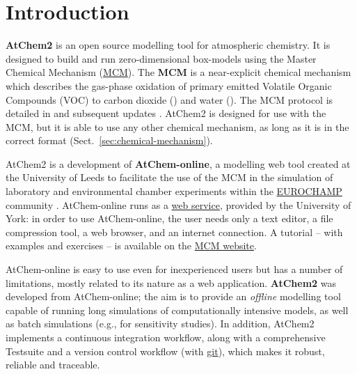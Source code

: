 %
%
%
%

\chapter{Introduction} \label{ch:introduction}

\textbf{AtChem2} is an open source modelling tool for atmospheric
chemistry. It is designed to build and run zero-dimensional
box-models using the Master Chemical Mechanism
(\href{https://mcm.york.ac.uk/MCM}{MCM}). The \textbf{MCM} is a
near-explicit chemical mechanism which describes the gas-phase
oxidation of primary emitted Volatile Organic Compounds (VOC) to
carbon dioxide () and water (). The MCM protocol is
detailed in \citet{jenkin_1997} and subsequent updates
\citep{saunders_2003, jenkin_2003, bloss_2005, jenkin_2012, jenkin_2015}.
AtChem2 is designed for use with the MCM, but it is able to use any
other chemical mechanism, as long as it is in the correct format
(Sect.~\ref{sec:chemical-mechanism}).

AtChem2 is a development of \textbf{AtChem-online}, a modelling web
tool created at the University of Leeds to facilitate the use of the
MCM in the simulation of laboratory and environmental chamber
experiments within the \href{https://www.eurochamp.org}{EUROCHAMP}
community \citep{martin_2009}. AtChem-online runs as a
\href{https://atchem.york.ac.uk}{web service}, provided by the
University of York: in order to use AtChem-online, the user needs only
a text editor, a file compression tool, a web browser, and an internet
connection. A tutorial -- with examples and exercises -- is available on
the \href{https://mcm.york.ac.uk/MCM/atchemonline/intro}{MCM website}.

AtChem-online is easy to use even for inexperienced users but has a
number of limitations, mostly related to its nature as a web
application. \textbf{AtChem2} was developed from AtChem-online; the
aim is to provide an \emph{offline} modelling tool capable of running
long simulations of computationally intensive models, as well as batch
simulations (e.g., for sensitivity studies). In addition, AtChem2
implements a continuous integration workflow, along with a
comprehensive Testsuite and a version control workflow (with
\href{https://git-scm.com}{git}), which makes it robust, reliable and
traceable.

